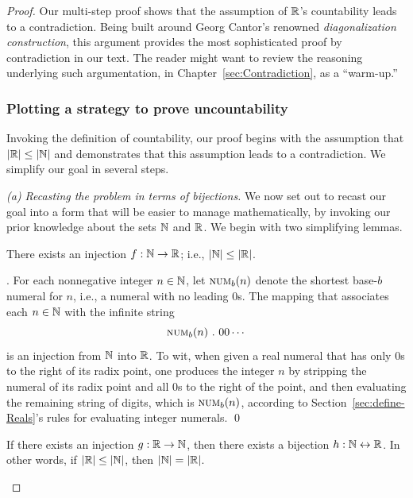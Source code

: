 \begin{proof}
Our multi-step proof shows that the assumption of $\mathbb{R}$'s countability
leads to a contradiction.  Being built around Georg Cantor's renowned
{\it diagonalization construction},  this
argument provides the most sophisticated proof by contradiction in our
text.  The reader might want to review the reasoning underlying such
argumentation, in Chapter~\ref{sec:Contradiction}, as a ``warm-up.''

\subsubsection{Plotting a strategy to prove uncountability}

Invoking the definition of countability, our proof begins with the
assumption that $|\mathbb{R}| \leq |\mathbb{N}|$ and demonstrates that this assumption
leads to a contradiction.  We simplify our goal in several steps.

{\it (a) Recasting the problem in terms of bijections.}
We now set out to recast our goal into a form that will be easier to
manage mathematically, by invoking our prior knowledge about the sets
$\mathbb{N}$ and $\mathbb{R}$.  We begin with two simplifying lemmas.

\begin{lemma}
\label{lem:N-leq-R}
There exists an injection $f: \mathbb{N} \rightarrow \mathbb{R}$; i.e., $|\mathbb{N}| \leq
|\mathbb{R}|$.
\end{lemma}

.
%
For each nonnegative integer $n \in \mathbb{N}$, let $\mbox{\sc num}_b(n)$
denote the shortest base-$b$ numeral for $n$, i.e., a numeral with no
leading $0$s.  The mapping that associates each $n \in \mathbb{N}$ with the
infinite string
\[ \mbox{\sc num}_b(n) \ . \ 00 \cdots \]
is an injection from $\mathbb{N}$ into $\mathbb{R}$.  To wit, when given a real
numeral that has only $0$s to the right of its radix point, one
produces the integer $n$ by stripping the numeral of its radix point
and all $0$s to the right of the point, and then evaluating the
remaining string of digits, which is $\mbox{\sc num}_b(n)$, according
to Section~\ref{sec:define-Reals}'s rules for evaluating integer
numerals.  \qed

\begin{lemma}
\label{lem:N-=-R}
If there exists an injection $g: \mathbb{R} \rightarrow \mathbb{N}$, then there exists
a bijection $h: \mathbb{N} \leftrightarrow \mathbb{R}$.  In other words, if $|\mathbb{R}| \leq
|\mathbb{N}|$, then $|\mathbb{N}| = |\mathbb{R}|$.
\end{lemma}


\end{proof}

